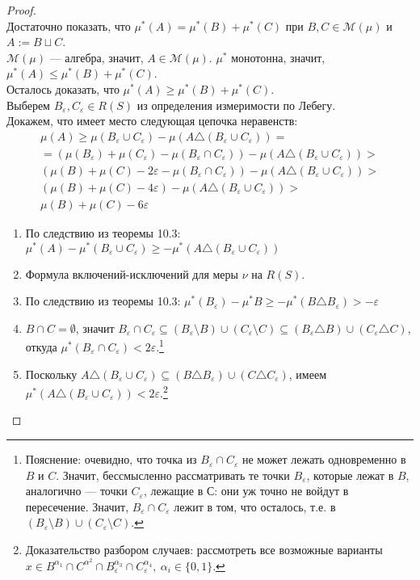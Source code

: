 \documentclass[11pt,a4paper]{report}
\def\eps{\varepsilon}
\theoremstyle{definition}
\theoremstyle{definition}
\theoremstyle{definition}
\begin{document}
	\begin{proof}$  $\\
		Достаточно показать, что $ \mu^{*}(A) = \mu^{*}(B) + \mu^{*}(C) $ при $ B, C \in \mathcal{M}(\mu) $ и $ A := B \sqcup C $.\\
		$ \mathcal{M}(\mu) $ — алгебра, значит, $ A \in \mathcal{M}(\mu) $. $ \mu^{*} $ монотонна, значит, $ \mu^{*}(A) \le \mu^{*}(B) + \mu^{*}(C) $.\\
		Осталось доказать, что $ \mu^{*}(A) \ge \mu^{*}(B) + \mu^{*}(C) $.\\
		Выберем $ B_{\eps}, C_{\eps} \in R(S) $ из определения измеримости по Лебегу.\\
		Докажем, что имеет место следующая цепочка неравенств:
		\begin{gather}
			\mu(A) \ge \mu(B_{\eps} \cup C_{\eps}) - \mu(A \triangle (B_{\eps} \cup C_{\eps})) =\\
			= (\mu(B_{\eps}) + \mu(C_{\eps}) - \mu(B_{\eps} \cap C_{\eps})) - \mu(A \triangle (B_{\eps} \cup C_{\eps})) >\\
			(\mu(B) + \mu(C) - 2\eps - \mu(B_{\eps} \cap C_{\eps})) - \mu(A \triangle (B_{\eps} \cup C_{\eps})) >\\
			(\mu(B) + \mu(C) - 4\eps) - \mu(A \triangle (B_{\eps} \cup C_{\eps})) >\\
			\mu(B) + \mu(C) - 6\eps
		\end{gather}
		\begin{enumerate}[(1)]
			\item По следствию из теоремы 10.3: $ \mu^{*}(A) - \mu^{*}(B_{\eps} \cup C_{\eps}) \ge -\mu^{*}(A \triangle (B_{\eps} \cup C_{\eps})) $
			\item Формула включений-исключений для меры $ \nu $ на $ R(S) $.
			\item По следствию из теоремы 10.3: $ \mu^{*}(B_{\eps}) - \mu^{*}{B} \ge -\mu^{*}(B \triangle B_{\eps}) > -\eps $
			\item $ B \cap C = \emptyset $, значит $ B_{\eps} \cap C_{\eps} \subseteq (B_{\eps} \setminus B) \cup (C_{\eps} \setminus C) \subseteq (B_{\eps} \triangle B) \cup (C_{\eps} \triangle C) $, откуда $ \mu^{*}(B_{\eps} \cap C_{\eps}) < 2\eps $.\footnote{Пояснение: очевидно, что точка из $ B_{\eps} \cap C_{\eps} $ не может лежать одновременно в $ B $ и $ C $. Значит, бессмысленно рассматривать те точки $ B_{\eps} $, которые лежат в $ B $, аналогично — точки $ C_{\eps} $, лежащие в $ С $: они уж точно не войдут в пересечение. Значит, $ B_{\eps} \cap C_{\eps} $ лежит в том, что осталось, т.е. в $ (B_{\eps }\setminus B) \cup (C_{\eps} \setminus C) $.}
			\item Поскольку $ A \triangle (B_{\eps} \cup C_{\eps}) \subseteq (B \triangle B_{\eps}) \cup (C \triangle C_{\eps}) $, имеем $ \mu^{*}(A \triangle (B_{\eps} \cup C_{\eps})) < 2\eps $.\footnote{Доказательство разбором случаев: рассмотреть все возможные варианты $ x \in B^{\alpha_{1}} \cap C^{\alpha^{2}} \cap B_{\eps}^{\alpha_{3}} \cap C_{\eps}^{\alpha_{4}},\ \alpha_{i} \in \{0, 1\} $.}
		\end{enumerate}
	\end{proof}
\end{document}
